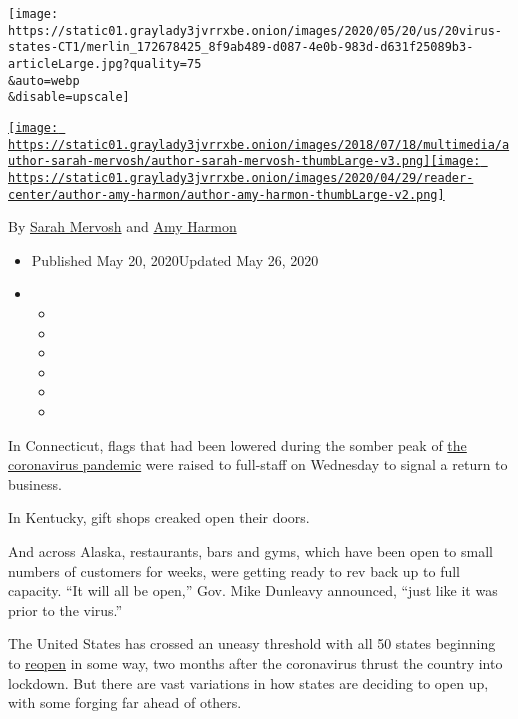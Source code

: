 \texttt{[image: https://static01.graylady3jvrrxbe.onion/images/2020/05/20/us/20virus-states-CT1/merlin\_172678425\_8f9ab489-d087-4e0b-983d-d631f25089b3-articleLarge.jpg?quality=75\\\&auto=webp\\\&disable=upscale]}

\href{https://www.nytimes3xbfgragh.onion/by/sarah-mervosh}{\texttt{[image: https://static01.graylady3jvrrxbe.onion/images/2018/07/18/multimedia/author-sarah-mervosh/author-sarah-mervosh-thumbLarge-v3.png]}}\href{https://www.nytimes3xbfgragh.onion/by/amy-harmon}{\texttt{[image: https://static01.graylady3jvrrxbe.onion/images/2020/04/29/reader-center/author-amy-harmon/author-amy-harmon-thumbLarge-v2.png]}}

By \href{https://www.nytimes3xbfgragh.onion/by/sarah-mervosh}{Sarah
Mervosh} and \href{https://www.nytimes3xbfgragh.onion/by/amy-harmon}{Amy
Harmon}

\begin{itemize}
\item
  Published May 20, 2020Updated May 26, 2020
\item
  \begin{itemize}
  \item
  \item
  \item
  \item
  \item
  \item
  \end{itemize}
\end{itemize}

In Connecticut, flags that had been lowered during the somber peak of
\href{https://www.nytimes3xbfgragh.onion/news-event/coronavirus}{the
coronavirus pandemic} were raised to full-staff on Wednesday to signal a
return to business.

In Kentucky, gift shops creaked open their doors.

And across Alaska, restaurants, bars and gyms, which have been open to
small numbers of customers for weeks, were getting ready to rev back up
to full capacity. ``It will all be open,'' Gov. Mike Dunleavy announced,
``just like it was prior to the virus.''

The United States has crossed an uneasy threshold with all 50 states
beginning to
\href{https://www.nytimes3xbfgragh.onion/2020/05/26/us/lake-of-the-ozarks-coronavirus.html}{reopen}
in some way, two months after the coronavirus thrust the country into
lockdown. But there are vast variations in how states are deciding to
open up, with some forging far ahead of others.

